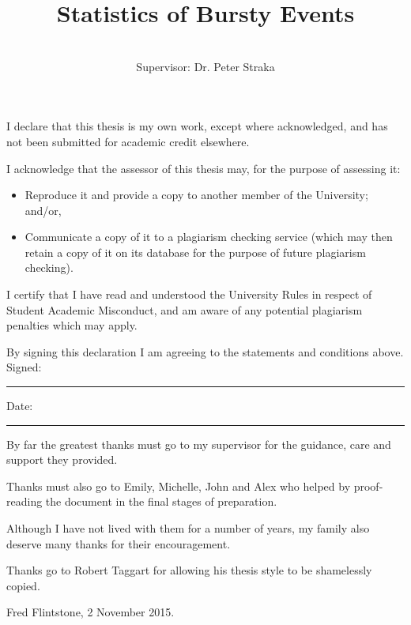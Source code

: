 \documentclass[honours,12pt]{UNSWthesis}
\title{Statistics of Bursty Events}
\author{\Authornameonly\\{\bigskip}Supervisor: Dr. Peter Straka}
\newcommand{\1}{\mathbf 1}
\newcommand\blankpage{%
    \null
    \thispagestyle{empty}%
    \addtocounter{page}{-1}%
    \newpage}
\numberwithin{equation}{section}
\theoremstyle{definition}
\theoremstyle{remark}
\begin{document}
\beforepreface

\afterpage{\blankpage}



\vskip 10pc \noindent I declare that this thesis is my
own work, except where acknowledged, and has not been submitted for
academic credit elsewhere. 

\vskip 2pc  \noindent I acknowledge that the assessor of this
thesis may, for the purpose of assessing it:
\begin{itemize}
\item Reproduce it and provide a copy to another member of the University; and/or,
\item Communicate a copy of it to a plagiarism checking service (which may then retain a copy of it on its database for the purpose of future plagiarism checking).
\end{itemize}

\vskip 2pc \noindent I certify that I have read and understood the University Rules in
respect of Student Academic Misconduct, and am aware of any potential plagiarism penalties which may 
apply.\vspace{24pt}

\vskip 2pc \noindent By signing 
this declaration I am
agreeing to the statements and conditions above.
\vskip 2pc \noindent
Signed: \rule{7cm}{0.25pt} \hfill Date: \rule{4cm}{0.25pt} \newline
\vskip 1pc

\afterpage{\blankpage}




{\bigskip}By far the greatest thanks must go to my supervisor for
the guidance, care and support they provided. 

{\bigskip\noindent}Thanks 
must also go to Emily, Michelle, John and Alex who helped by
proof-reading the document in the final stages of preparation.

{\bigskip\noindent}Although
I have not lived with them for a number of years, my family also deserve
many thanks for their encouragement.

{\bigskip\noindent} Thanks go to Robert Taggart for allowing his thesis
style to be shamelessly copied.

{\bigskip\bigskip\bigskip\noindent} Fred Flintstone, 2 November 2015.

\afterpage{\blankpage}
\end{document}
